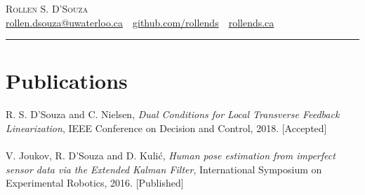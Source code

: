 \documentclass[oneside, 10pt]{memoir}
\begin{document}
\newcommand{\entryGeneral}[4]{
    \textbf{#2} \sourceatright{#1}
    \emph{#3}
    \begin{adjustwidth}{1em}{0em}
        #4
    \end{adjustwidth}
    \hfill
}

\newcommand{\entrySimple}[3]{
    \textbf{#2} \sourceatright{#1}
    \begin{adjustwidth}{1em}{0em}
        #3
    \end{adjustwidth}
    \hfill
}

%

\LARGE{\textsc{Rollen S. D'Souza}}\\
\small{\url{rollen.dsouza@uwaterloo.ca}~\textbullet~\url{github.com/rollends}~\textbullet~\url{rollends.ca} }\\
\rule{\linewidth}{0.4pt}

\section*{Publications}
\begin{adjustwidth}{1em}{0em}%
R. S. D'Souza and C. Nielsen, \emph{Dual Conditions for Local Transverse Feedback Linearization}, IEEE Conference on Decision and Control, 2018. [Accepted] \hfill \\
\hfill \\
V. Joukov, R. D'Souza and D. Kuli\'{c}, \emph{Human pose estimation from imperfect sensor data via the Extended Kalman 
Filter}, International Symposium on Experimental Robotics, 2016. [Published]
\end{adjustwidth}
\end{document}
